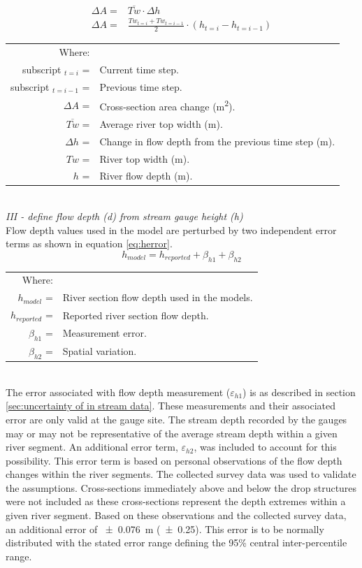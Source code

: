 \begin{linenumbers}
\begin{align}
	\Delta A= & \overline{Tw}\cdot \Delta h \nonumber \\
	\Delta A= & \frac{Tw_{t=i} + Tw_{t=i-1}}{2} \cdot \left( h_{t=i} - h_{t=i-1} \right) \label{eq:XSArea}
\end{align}
\begin{tabular}{rl}
	Where: & \\
	subscript $_{t=i}$ = & Current time step. \\
	subscript $_{t=i-1}$ = & Previous time step. \\
	$\Delta A$ = & Cross-section area change (\si{\meter\squared}).\\
	$\overline{Tw}$ = & Average river top width (\si{\meter}).\\
	$\Delta h$ = & Change in flow depth from the previous time step (\si{\meter}). \\
	$Tw$ = & River top width (\si{\meter}). \\
	$h$ = & River flow depth (\si{\meter}). \\
\end{tabular}\\

\emph{III - define flow depth (d) from stream gauge height (h)}\\
Flow depth values used in the model are perturbed by two independent error terms as shown in equation \ref{eq:herror}.
\begin{equation}
	h_{model}=h_{reported}+\beta_{h1}+\beta_{h2}
	\label{eq:herror}
\end{equation}
\begin{tabular}{rl}
	Where: & \\
	$h_{model}$ = & River section flow depth used in the models.\\
	$h_{reported}$ = & Reported river section flow depth.\\
	$\beta_{h1}$ = & Measurement error.\\
	$\beta_{h2}$ = & Spatial variation.\\
\end{tabular}\\

The error associated with flow depth measurement ($\varepsilon_{h1}$) is as described in section \ref{sec:uncertainty of in stream data}.  These measurements and their associated error are only valid at the gauge site.  The stream depth recorded by the gauges may or may not be representative of the average stream depth within a given river segment.  An additional error term, $\varepsilon_{h2}$, was included to account for this possibility.  This error term is based on personal observations of the flow depth changes within the river segments.  The collected survey data was used to validate the assumptions.  Cross-sections immediately above and below the drop structures were not included as these cross-sections represent the depth extremes within a given river segment.  Based on these observations and the collected survey data, an additional error of \SI{\pm 0.076}{\meter} (\SI{\pm 0.25}{\foot}).  This error is to be normally distributed with the stated error range defining the 95\% central inter-percentile range.


\end{linenumbers}
